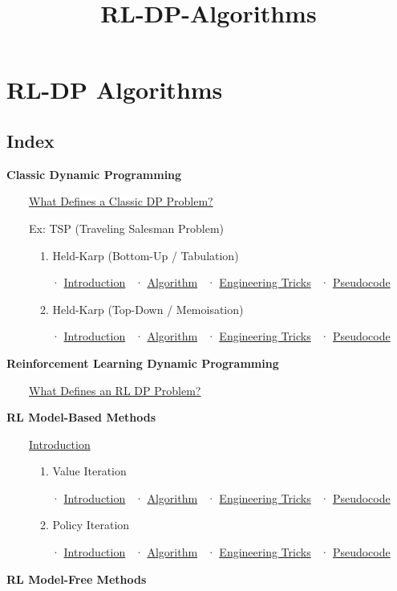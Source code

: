 \documentclass[11pt]{article}
\title{RL-DP-Algorithms}
\begin{document}
    
    \maketitle
    
    

    
    \section{RL-DP Algorithms}\label{rl-dp-algorithms}

    \clearpage

\subsection{Index}\label{index}

\textbf{Classic Dynamic Programming}

  \hyperref[classic-dp-intro]{What Defines a Classic DP Problem?}

  Ex: TSP (Traveling Salesman Problem)

   1. Held-Karp (Bottom-Up / Tabulation)

   ~~· \hyperref[intro-1-3]{Introduction} ~·
\hyperref[held-karp-bottom-up]{Algorithm} ~·
\hyperref[tricks-1-3]{Engineering Tricks} ~·
\hyperref[pseudo-1-3]{Pseudocode}

   2. Held-Karp (Top-Down / Memoisation)

   ~~· \hyperref[intro-1-4]{Introduction} ~·
\hyperref[held-karp-top-down]{Algorithm} ~·
\hyperref[tricks-1-4]{Engineering Tricks} ~·
\hyperref[pseudo-1-4]{Pseudocode}

\textbf{Reinforcement Learning Dynamic Programming}

  \hyperref[rl-dp-intro]{What Defines an RL DP Problem?}

\textbf{RL Model-Based Methods}

  \hyperref[model-based-intro]{Introduction}

   1. Value Iteration

   ~~· \hyperref[intro-1-1]{Introduction} ~·
\hyperref[value-iteration-algo]{Algorithm} ~·
\hyperref[tricks-1-1]{Engineering Tricks} ~·
\hyperref[pseudo-1-1]{Pseudocode}

   2. Policy Iteration

   ~~· \hyperref[intro-1-2]{Introduction} ~·
\hyperref[policy-iteration-algo]{Algorithm} ~·
\hyperref[tricks-1-2]{Engineering Tricks} ~·
\hyperref[pseudo-1-2]{Pseudocode}

\textbf{RL Model-Free Methods}
\end{document}
